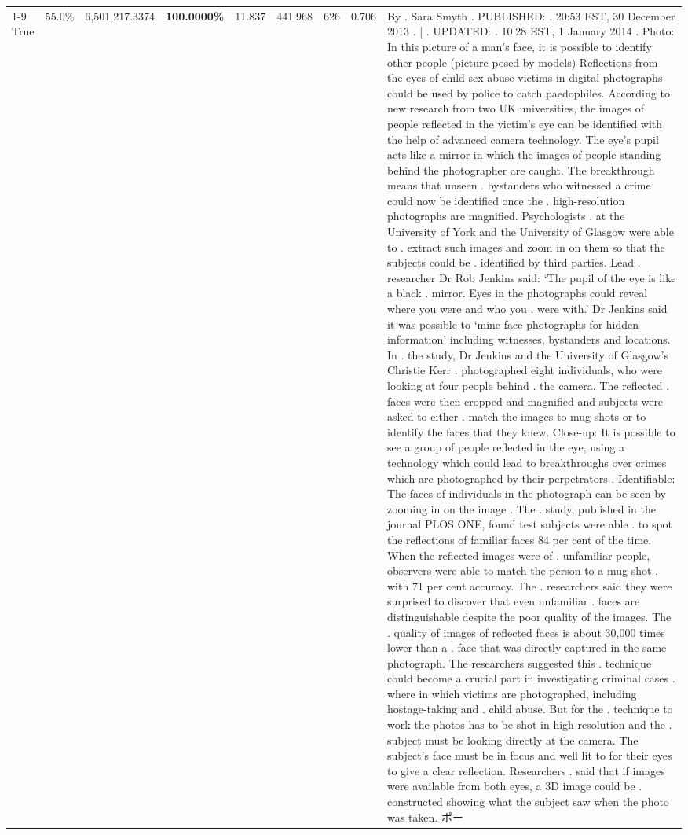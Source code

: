 \begin{table}[H]
\begin{tabular}{lllrlllll}
\cline{1-9}
True & 55.0\% & 6,501,217.3374 & \bfseries \color{red} 100.0000\% & 11.837 & 441.968 & 626 & 0.706 & By . Sara Smyth . PUBLISHED: . 20:53 EST, 30 December 2013 . | . UPDATED: . 10:28 EST, 1 January 2014 . Photo: In this picture of a man's face, it is possible to identify other people (picture posed by models) Reflections from the eyes of child sex abuse victims in digital photographs could be used by police to catch paedophiles. According to new research from two UK universities, the images of people reflected in the victim's eye can be identified with the help of advanced camera technology. The eye's pupil acts like a mirror in which the images of people standing behind the photographer are caught. The breakthrough means that unseen . bystanders who witnessed a crime could now be identified once the . high-resolution photographs are magnified. Psychologists . at the University of York and the University of Glasgow were able to . extract such images and zoom in on them so that the subjects could be . identified by third parties. Lead . researcher Dr Rob Jenkins said: ‘The pupil of the eye is like a black . mirror. Eyes in the photographs could reveal where you were and who you . were with.' Dr Jenkins said it was possible to ‘mine face photographs for hidden information' including witnesses, bystanders and locations. In . the study, Dr Jenkins and the University of Glasgow's Christie Kerr . photographed eight individuals, who were looking at four people behind . the camera. The reflected . faces were then cropped and magnified and subjects were asked to either . match the images to mug shots or to identify the faces that they knew. Close-up: It is possible to see a group of people reflected in the eye, using a technology which could lead to breakthroughs over crimes which are photographed by their perpetrators . Identifiable: The faces of individuals in the photograph can be seen by zooming in on the image . The . study, published in the journal PLOS ONE, found test subjects were able . to spot the reflections of familiar faces 84 per cent of the time. When the reflected images were of . unfamiliar people, observers were able to match the person to a mug shot . with 71 per cent accuracy. The . researchers said they were surprised to discover that even unfamiliar . faces are distinguishable despite the poor quality of the images. The . quality of images of reflected faces is about 30,000 times lower than a . face that was directly captured in the same photograph. The researchers suggested this . technique could become a crucial part in investigating criminal cases . where in which victims are photographed, including hostage-taking and . child abuse. But for the . technique to work the photos has to be shot in high-resolution and the . subject must be looking directly at the camera. The subject's face must be in focus and well lit to for their eyes to give a clear reflection. Researchers . said that if images were available from both eyes, a 3D image could be . constructed showing what the subject saw when the photo was taken. ポー \\

\end{tabular}
\end{table}
